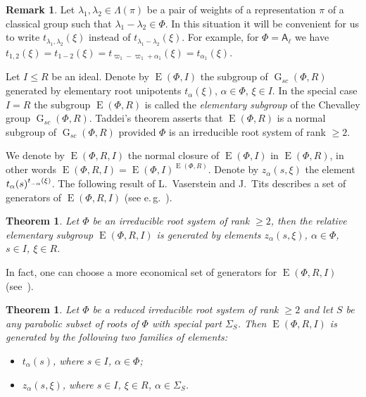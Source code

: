 \documentclass[12pt]{amsart}
\numberwithin{equation}{section}
\newcounter{thmcounter} \newcounter{lemmacounter}
\newtheorem{thm}[thmcounter]{Theorem}
\theoremstyle{definition}
\newtheorem{rem}[equation]{Remark}
\DeclareMathOperator{\G}{G}
\DeclareMathOperator{\E}{E}
\newcommand{\rA}{\mathsf{A}}
\def\ssub#1{\mathchoice
   {_{\lower2pt\hbox{$\scriptstyle #1$}}}
   {_{\lower2pt\hbox{$\scriptstyle #1$}}}
   {_{\lower1.5pt\hbox{$\scriptscriptstyle #1$}}}
   {_{\!\lower1.5pt\hbox{$\scriptscriptstyle #1$}}}}
\begin{document}
\begin{rem} Let $\lambda_1, \lambda_2 \in \Lambda(\pi)$ be a pair of weights of a representation $\pi$ of a classical group such that $\lambda_1-\lambda_2\in \Phi$.
In this situation it will be convenient for us to write $t_{\lambda_1,\lambda_2}(\xi)$ instead of $t_{\lambda_1-\lambda_2}(\xi)$.
For example, for $\Phi=\rA_\ell$ we have $t_{1,2}(\xi)=t_{1-2}(\xi)=t_{\varpi_1 - \varpi_1 + \alpha_1}(\xi) = t_{\alpha_1}(\xi)$. \end{rem}

Let $I\leq R$ be an ideal. Denote by $\E(\Phi, I)$ the subgroup of $\G_{sc}(\Phi, R)$ generated by elementary root unipotents $t_\alpha(\xi)$, $\alpha\in\Phi$, $\xi\in I$.
In the special case $I=R$ the subgroup $\E(\Phi, R)$ is called the {\it elementary subgroup} of the Chevalley group $\G_{sc}(\Phi, R)$.
Taddei's theorem asserts that $\E(\Phi, R)$ is a normal subgroup of $\G_{sc}(\Phi, R)$ provided $\Phi$ is an irreducible root system of rank $\geq 2$.

We denote by $\E(\Phi, R, I)$ the normal closure of $\E(\Phi, I)$ in $\E(\Phi, R)$, in other words $\E(\Phi, R, I) = \E(\Phi, I)^{\E(\Phi, R)}$.
Denote by $z_\alpha(s, \xi)$ the element $t_\alpha(s)^{t\ssub{-\alpha}(\xi)}$.
The following result of L.~Vaserstein and J.~Tits describes a set of generators of $\E(\Phi, R, I)$ (see e.\,g.~\cite[Theorem~2]{Va86}).

\begin{thm} Let $\Phi$ be an irreducible root system of rank $\geq 2$, then the relative elementary subgroup $\E(\Phi, R, I)$
is generated by elements $z_\alpha(s, \xi)$, $\alpha\in \Phi$, $s\in I$, $\xi\in R$.
\end{thm}

In fact, one can choose a more economical set of generators for $\E(\Phi, R, I)$ (see~\cite[Theorem~3.4]{S}).
\begin{thm}\label{theorem:Stepanov}
Let $\Phi$ be a reduced irreducible root system of rank $\geq 2$ and let $S$ be any parabolic subset of roots of $\Phi$ with special part $\Sigma_S$.
Then $\E(\Phi, R, I)$ is generated by the following two families of elements:
\begin{itemize}
 \item $t_{\alpha}(s)$, where $s\in I$, $\alpha\in\Phi$;
 \item $z_\alpha(s,\xi)$, where $s\in I$, $\xi\in R$, $\alpha\in\Sigma_S$. \end{itemize} \end{thm}
\end{document}
